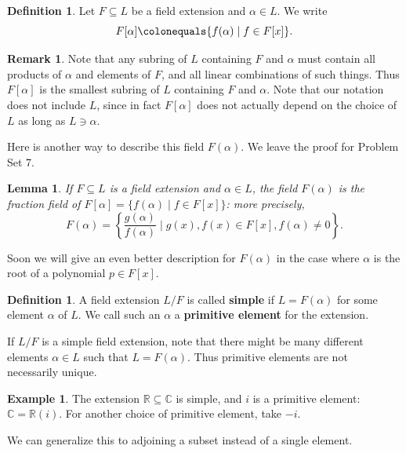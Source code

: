 \documentclass[12pt]{report}
\newtheorem{lemma}[theorem]{Lemma}
\numberwithin{equation}{section}
\numberwithin{theorem}{chapter}
\theoremstyle{definition}
\newtheorem{definition}[theorem]{Definition}
\newtheorem{example}[theorem]{Example}
\newtheorem*{basic properties}{Basic Properties}
\newtheorem*{Important Remark}{Important Remark}
\newtheorem{remark}[theorem]{Remark}
\newcommand{\df}[1]{{\bf #1}\index{#1}}
\newcommand{\R}{\mathbb{R}}
\newcommand{\C}{\mathbb{C}}
\begin{document}
\begin{definition}
	Let $F \subseteq L$ be a field extension and $\alpha \in L$. We write
	$$F[\alpha] \colonequals \{f(\alpha) \mid f\in F[x]\}.$$
\end{definition}

\begin{remark}
Note that any subring of $L$ containing $F$ and $\alpha$ must contain all products of $\alpha$ and elements of $F$, and all linear combinations of such things. Thus $F[\alpha]$ is the smallest subring of $L$ containing $F$ and $\alpha$. Note that our notation does not include $L$, since in fact $F[\alpha]$ does not actually depend on the choice of $L$ as long as $L \ni \alpha$.
\end{remark}



Here is another way to describe this field $F(\alpha)$. We leave the proof for Problem Set 7.

\begin{lemma}\label{lemma description F(a)}
 If $F \subseteq L$ is a field extension and $\alpha \in L$, the field $F(\alpha)$ is the fraction field of $F[\alpha]=\{f(\alpha)\mid f\in F[x]\}$: more precisely,
$$F(\alpha) = \left\{ \frac{g(\alpha)}{f(\alpha)} \mid g(x), f(x) \in F[x], f(\alpha) \neq 0 \right\}.$$
\end{lemma}

Soon we will give an even better description for $F(\alpha)$ in the case where $\alpha$ is the root of a polynomial $p \in F[x]$.

\begin{definition}
A field extension $L/F$ is called {\bf simple} if $L = F(\alpha)$ for some element $\alpha$ of $L$. We call such an $\alpha$ a \df{primitive element} for the extension.
\end{definition}

If $L/F$ is a simple field extension, note that there might be many different elements $\alpha \in L$ such that $L = F(\alpha)$. Thus primitive elements are not necessarily unique.


\begin{example}
	The extension $\R \subseteq \C$ is simple, and $i$ is a primitive element: $\C = \R(i)$. For another choice of primitive element, take $-i$.
\end{example}


We can generalize this to adjoining a subset instead of a single element. 
\end{document}
